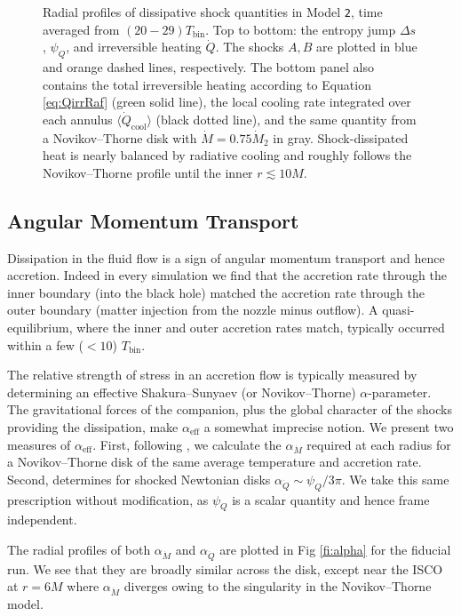 \documentclass{emulateapj}
\newcommand{\al}{\alpha}
\newcommand{\De}{\Delta}
\newcommand{\model}[1]{{Model \texttt{#1}}}
\newcommand{\avet}[1]{ \langle #1 \rangle}
\begin{document}
\begin{figure}
\caption{\label{fi:diss} Radial profiles of dissipative shock quantities in \model{2}, time averaged from $(20 - 29) T_\text{bin}$.  Top to bottom: the entropy jump $\De s$, $\psi_Q$, and irreversible heating $\dot{Q}$. The shocks $A,B$ are plotted in blue and orange dashed lines, respectively.  The bottom panel also contains the total irreversible heating according to Equation \eqref{eq:QirrRaf} (green solid line), the local cooling rate integrated over each annulus $\avet{\dot{Q}_\text{cool}}$  (black dotted line), and the same quantity from a Novikov--Thorne disk with $\dot{M} = 0.75 \dot{M}_2$ in gray.  Shock-dissipated heat is nearly balanced by radiative cooling and roughly follows the Novikov--Thorne profile until the inner $r\lesssim 10M$.}
\end{figure}

\subsection{Angular Momentum Transport}
\label{subsec:angmom}

Dissipation in the fluid flow is a sign of angular momentum transport and hence accretion. Indeed in every simulation we find that the accretion rate through the inner boundary (into the black hole) matched the accretion rate through the outer boundary (matter injection from the nozzle minus outflow).  A quasi-equilibrium, where the inner and outer accretion rates match, typically occurred within a few ($<10$) $T_\text{bin}$. 

The relative strength of stress in an accretion flow is typically measured by determining an effective Shakura--Sunyaev (or Novikov--Thorne) $\al$-parameter.  The gravitational forces of the companion, plus the global character of the shocks providing the dissipation, make $\al_{\text{eff}}$ a somewhat imprecise notion.  We present two measures of $\al_{\text{eff}}$.  First, following \cite{Ju16}, we calculate the $\al_{\dot{M}}$ required at each radius for a Novikov--Thorne disk of the same average temperature and accretion rate.  Second, \cite{Rafikov16} determines for shocked Newtonian disks $\al_{\dot{Q}} \sim \psi_Q / 3\pi$.  We take this same prescription without modification, as $\psi_Q$ is a scalar quantity and hence frame independent.  

The radial profiles of both $\al_{\dot{M}}$ and $\al_{\dot{Q}}$ are plotted in Fig \ref{fi:alpha} for the fiducial run.  We see that they are broadly similar across the disk, except near the ISCO at $r=6M$ where $\al_{\dot{M}}$ diverges owing to the singularity in the Novikov--Thorne model.
\end{document}

